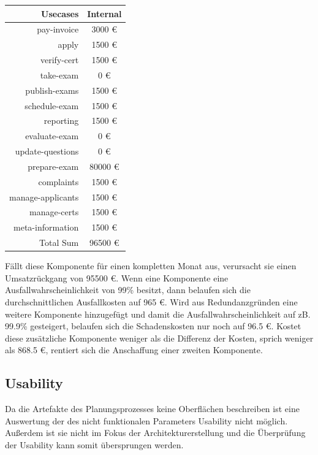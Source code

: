 \begin{tabular}{ | r | c | }
    \hline
    Usecases & Internal \\
    \hline
    pay-invoice & 3000 \euro \\
    \hline
    apply & 1500 \euro \\
    \hline
    verify-cert & 1500 \euro \\
    \hline
    take-exam & 0 \euro \\
    \hline
    publish-exams & 1500 \euro \\
    \hline
    schedule-exam & 1500 \euro \\
    \hline
    reporting & 1500 \euro \\
    \hline
    evaluate-exam & 0 \euro \\
    \hline
    update-questions & 0 \euro \\
    \hline
    prepare-exam & 80000 \euro \\
    \hline
    complaints & 1500 \euro \\
    \hline
    manage-applicants & 1500 \euro \\
    \hline
    manage-certs & 1500 \euro \\
    \hline
    meta-information & 1500 \euro \\
    \hline
    Total Sum & 96500 \euro \\
    \hline
\end{tabular}

\hfill \break

Fällt diese Komponente für einen kompletten Monat aus, verursacht sie einen Umsatzrückgang von 95500 \euro. Wenn eine Komponente eine Ausfallwahrscheinlichkeit von 99\% besitzt, dann belaufen sich die durchschnittlichen Ausfallkosten auf 965 \euro. Wird aus Redundanzgründen eine weitere Komponente hinzugefügt und damit die Ausfallwahrscheinlichkeit auf zB. 99.9\% gesteigert, belaufen sich die Schadenskosten nur noch auf 96.5 \euro. Kostet diese zusätzliche Komponente weniger als die Differenz der Kosten, sprich weniger als 868.5 \euro, rentiert sich die Anschaffung einer zweiten Komponente.

\subsection{Usability}
Da die Artefakte des Planungsprozesses keine Oberflächen beschreiben ist eine Auswertung der des nicht funktionalen Parameters Usability nicht möglich. Außerdem ist sie nicht im Fokus der Architekturerstellung und die Überprüfung der Usability kann somit übersprungen werden.

